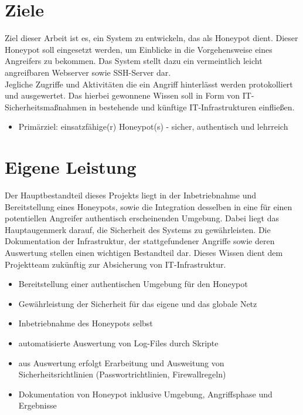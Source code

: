 \newpage


\section{Ziele}
\label{sec:Ziele}

Ziel dieser Arbeit ist es, ein System zu entwickeln, das als Honeypot dient. Dieser Honeypot soll eingesetzt werden, um Einblicke in die Vorgehensweise eines Angreifers zu bekommen. 
Das System stellt dazu ein vermeintlich leicht angreifbaren Webserver sowie SSH-Server dar.\\


Jegliche Zugriffe und Aktivitäten die ein Angriff hinterlässt werden protokolliert und ausgewertet. Das hierbei gewonnene Wissen soll in Form von IT-Sicherheitsmaßnahmen in bestehende und künftige IT-Infrastrukturen einfließen.

\begin{itemize}
\item Primärziel: einsatzfähige(r) Honeypot(s) - sicher, authentisch und lehrreich
\end{itemize}




\section{Eigene Leistung}
\label{sec:Eigene Leistung}

Der Hauptbestandteil dieses Projekts liegt in der Inbetriebnahme und Bereitstellung eines Honeypots, sowie die Integration desselben in eine für einen potentiellen Angreifer authentisch erscheinenden Umgebung. Dabei liegt das Hauptaugenmerk darauf, die Sicherheit des Systems zu gewährleisten. Die Dokumentation der Infrastruktur, der stattgefundener Angriffe sowie deren Auswertung stellen einen wichtigen Bestandteil dar. Dieses Wissen dient dem Projektteam zukünftig zur Absicherung von IT-Infrastruktur.

\begin{itemize}
\item Bereitstellung einer authentischen Umgebung für den Honeypot
\item Gewährleistung der Sicherheit für das eigene und das globale Netz
\item Inbetriebnahme des Honeypots selbst
\item automatisierte Auswertung von Log-Files durch Skripte
\item aus Auswertung erfolgt Erarbeitung und Ausweitung von Sicherheitsrichtlinien (Passwortrichtlinien, Firewallregeln)
\item Dokumentation von Honeypot inklusive Umgebung, Angriffsphase und Ergebnisse
\end{itemize}


